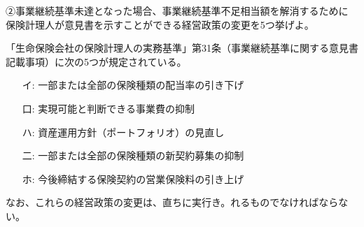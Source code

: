\documentclass[report,gutter=10mm,fore-edge=10mm,uplatex,dvipdfmx]{jlreq}
\begin{document}
②事業継続基準未達となった場合、事業継続基準不足相当額を解消するために
保険計理人が意見書を示すことができる経営政策の変更を5つ挙げよ。

「生命保険会社の保険計理人の実務基準」第31条（事業継続基準に関する意見書記載事項）に次の5つが規定されている。

\begin{itemize}
\item[ イ: ] 一部または全部の保険種類の配当率の引き下げ
\item[ 口: ] 実現可能と判断できる事業費の抑制
\item[ ハ: ] 資産運用方針（ポートフォリオ）の見直し
\item[ 二: ] 一部または全部の保険種類の新契約募集の抑制
\item[ ホ: ] 今後締結する保険契約の営業保険料の引き上げ
\end{itemize}

なお、これらの経営政策の変更は、直ちに実行き。れるものでなければならない。






\end{document}
